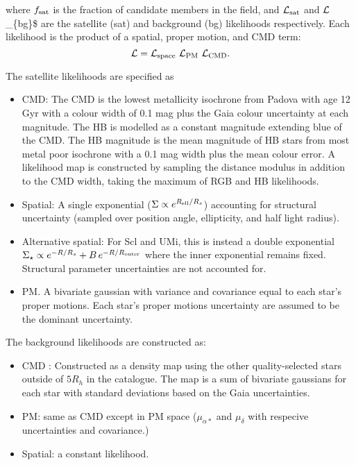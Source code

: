 where \(f_{\rm sat}\) is the fraction of candidate members in the field,
and \({\cal L}_{\rm sat}\) and \({\cal L}\)\_\{\rm bg\}\$ are the
satellite (sat) and background (bg) likelihoods respectively. Each
likelihood is the product of a spatial, proper motion, and CMD term: \[
{\cal L} = {\cal L}_{\rm space}\ {\cal L}_{\rm PM}\ {\cal L}_{\rm CMD}.
\]

The satellite likelihoods are specified as

\begin{itemize}
\tightlist
\item
  CMD: The CMD is the lowest metallicity isochrone from Padova
  \citep{girardi+2002} with age 12 Gyr with a colour width of 0.1 mag
  plus the Gaia colour uncertainty at each magnitude. The HB is modelled
  as a constant magnitude extending blue of the CMD. The HB magnitude is
  the mean magnitude of HB stars from most metal poor isochrone with a
  0.1 mag width plus the mean colour error. A likelihood map is
  constructed by sampling the distance modulus in addition to the CMD
  width, taking the maximum of RGB and HB likelihoods.
\item
  Spatial: A single exponential
  (\(\Sigma \propto e^{R_{\rm ell} / R_s}\)) accounting for structural
  uncertainty (sampled over position angle, ellipticity, and half light
  radius).
\item
  Alternative spatial: For Scl and UMi, this is instead a double
  exponential
  \(\Sigma_\star \propto e^{-R/R_s} + B\,e^{-R/R_{\rm outer}}\) where
  the inner exponential remains fixed. Structural parameter
  uncertainties are not accounted for.
\item
  PM. A bivariate gaussian with variance and covariance equal to each
  star's proper motions. Each star's proper motions uncertainty are
  assumed to be the dominant uncertainty.
\end{itemize}

The background likelihoods are constructed as:

\begin{itemize}
\tightlist
\item
  CMD : Constructed as a density map using the other quality-selected
  stars outside of \(5R_h\) in the catalogue. The map is a sum of
  bivariate gaussians for each star with standard deviations based on
  the Gaia uncertainties.
\item
  PM: same as CMD except in PM space (\(\mu_{\alpha*}\) and
  \(\mu_\delta\) with respecive uncertainties and covariance.)
\item
  Spatial: a constant likelihood.
\end{itemize}

